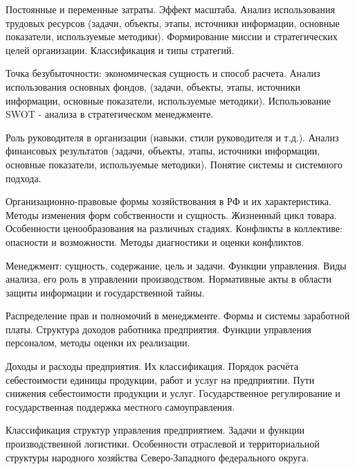 \documentclass[
	11pt,
	a4paper,
	]
	{article}
\begin{document}
\bigskip

\noindent{} 
	{
		Постоянные и переменные затраты. Эффект масштаба.
	}{
		Анализ использования трудовых ресурсов (задачи, объекты, этапы, источники информации, основные показатели, используемые методики).
	}{
		Формирование миссии и стратегических целей организации. Классификация и типы стратегий.
	}

\bigskip

\noindent{} 
	{
		Точка безубыточности: экономическая сущность и способ расчета.
	}{
		Анализ использования основных фондов, (задачи, объекты, этапы, источники информации, основные показатели, используемые методики).
	}{
		Использование SWOT - анализа в стратегическом менеджменте.
	}

\bigskip

\noindent{} 
	{
		Роль руководителя в организации (навыки, стили руководителя и т.д.).
	}{
		Анализ финансовых результатов (задачи, объекты, этапы, источники информации, основные показатели, используемые методики).
	}{
		Понятие системы и системного подхода.
	}

\bigskip

\noindent{} 
		{
			Организационно-правовые формы хозяйствования в РФ и их характеристика. Методы изменения форм собственности и сущность.
		}{
			Жизненный цикл товара. Особенности ценообразования на различных стадиях.
		}{
			Конфликты в коллективе: опасности и возможности. Методы диагностики и оценки конфликтов.
		}

\bigskip

\noindent{} 
		{
			Менеджмент: сущность, содержание, цель и задачи. Функции управления.
		}{
			Виды анализа, его роль в управлении производством.
		}{
			Нормативные акты в области защиты информации и государственной тайны.
		}

\bigskip

\noindent{} 
		{
			Распределение прав и полномочий в менеджменте.
		}{
			Формы и системы заработной платы. Структура доходов работника предприятия.
		}{
			Функции управления персоналом, методы оценки их реализации.
		}

\bigskip

\noindent{} 
		{
			Доходы и расходы предприятия. Их классификация.
		}{
			Порядок расчёта себестоимости единицы продукции, работ и услуг на предприятии. Пути снижения себестоимости продукции и услуг.
		}{
			Государственное регулирование и государственная поддержка местного самоуправления.
		}

\bigskip

\noindent{} 
		{
			Классификация структур управления предприятием.
		}{
			Задачи и функции производственной логистики.
		}{
			Особенности отраслевой и территориальной структуры народного хозяйства Северо-Западного федерального округа.
		}

\bigskip
\end{document}
